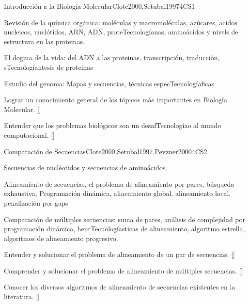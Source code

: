 \begin{syllabus}
\begin{unit}{Introducción a la Biología Molecular}{}{Clote2000,Setubal1997}{4}{CS1}
\begin{topics}
\item Revisión de la química orgánica: moléculas y macromoléculas, azúcares, acidos nucleicos, nuclótidos, ARN, ADN, proteTecnologíanas, aminoácidos y nivels de estructura en las proteinas. 
\item El dogma de la vida: del ADN a las proteinas, transcripción, traducción, sTecnologíantesis de proteinas
\item Estudio del genoma: Mapas y secuencias, técnicas especTecnologíaficas
\end{topics}
   \begin{learningoutcomes}
      \item  Lograr un conocimiento general de los tópicos más importantes en Biología Molecular. [\Familiarity]
	  \item Entender que los problemas biológicos son un desafTecnologíao al mundo computacional. [\Assessment]
   \end{learningoutcomes}
\end{unit}

\begin{unit}{Comparación de Secuencias}{}{Clote2000,Setubal1997,Pevzner2000}{4}{CS2}
\begin{topics}
\item Secuencias de nucléotidos y secuencias de aminoácidos.
\item Alineamiento de secuencias, el problema de alineamiento por pares, búsqueda exhaustiva, Programación dinámica, alineamiento global, alineamiento local, penalización por gaps
\item Comparación de múltiples secuencias: suma de pares, análisis de complejidad por programación dinámica, heurTecnologíasticas de alineamiento, algoritmo estrella, algoritmos de alineamiento progresivo.
\end{topics}
\begin{learningoutcomes}
\item  Entender y solucionar el problema de alineamiento de un par de secuencias. [\Usage]
\item  Comprender y solucionar el problema de alineamiento de múltiples secuencias. [\Usage]
\item Conocer los diversos algoritmos de alineamiento de secuencias existentes en la literatura. [\Familiarity]
\end{learningoutcomes}
\end{unit}


\end{syllabus}
